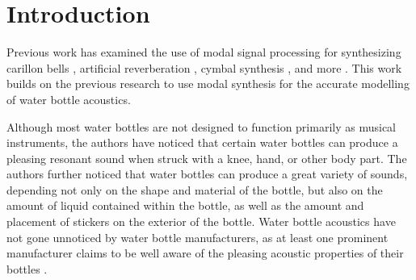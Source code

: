 \documentclass[twoside,a4paper]{article}
\title{\papertitle}
\affiliation{
\paperauthorA, \paperauthorB \, and \paperauthorC \, }
{\href{http://ccrma.stanford.edu}{Center for Computer Research in Music and Acoustics} \\ Stanford University \\ Stanford, CA, USA \\ {\tt\{jatin|kermit|mrau\}@ccrma.stanford.edu}}
\newif\ifpdf
\begin{document}
\ifpdf %
  \DeclareGraphicsExtensions{.png,.jpg,.pdf}
\else  %
\fi

\maketitle
%
\begin{abstract}
We present a method for accurately synthesizing the acoustic response
of a water bottle using modal signal processing. We start with extensive measurements of two water bottles with considerations for how the level of water inside the bottles, the number and placement of stickers attached to the exterior
of the bottles, and the method of striking the bottles affect their sound. We perform modal analysis of these measurements and implement  a real-time modal water bottle synthesizer.
\end{abstract}

\section{Introduction} \label{sec:intro}
%
Previous work has examined the use of modal signal processing
for synthesizing carillon bells \cite{canfielddafilou:werner:bellEffects:2017,
rau:das:canfielddafilou:carillon:2019}, artificial reverberation 
\cite{abel2014a}, cymbal synthesis \cite{travis_cymbals}, and more 
\cite{abel_kurt_modal,rocket-bells}. This work builds on the previous
research to use modal synthesis for the accurate modelling of water bottle 
acoustics.

Although most water bottles are not designed to function primarily as musical
instruments, the authors have noticed that certain water bottles
can produce a pleasing resonant sound when struck with a knee, hand,
or other body part. The authors further noticed that water bottles can
produce a great variety of sounds, depending not only on the shape and
material of the bottle, but also on the amount of liquid contained
within the bottle, as well as the amount and placement of stickers on the
exterior of the bottle. Water bottle acoustics have not gone unnoticed
by water bottle manufacturers, as at least one prominent manufacturer claims
to be well aware of the pleasing acoustic properties of their bottles
\cite{hydroflask_email}.
\end{document}
